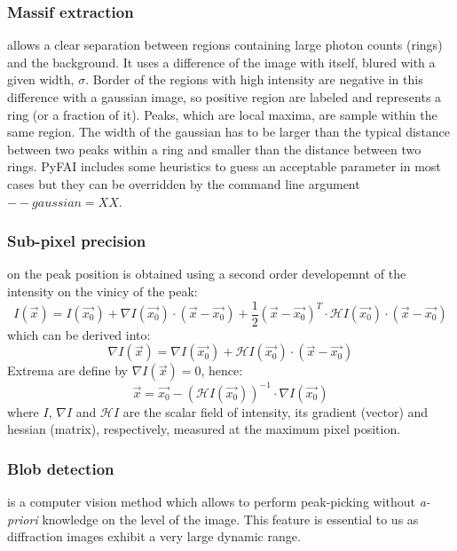 \documentclass[preprint]{iucr}
\begin{document}
\subsubsection{Massif extraction}
\label{massif}
allows a clear separation between regions containing large
photon counts (rings) and the background.
It uses a difference of the image with itself, blured with a given width,
$\sigma$. 
Border of the regions with high intensity are negative in this
difference with a gaussian image, so positive region are labeled and represents
a ring (or a fraction of it). Peaks, which are local maxima, are sample within
the same region.
The width of the gaussian has to be larger than the typical distance
between two peaks within a ring and smaller than the distance between two
rings. 
PyFAI includes some heuristics to guess an acceptable parameter in most cases
but they can be overridden by the command line argument $--gaussian=XX$.

\subsubsection{Sub-pixel precision} 
\label{subpixel}
on the peak position is obtained using a second order developemnt of the
intensity on the vinicy of the peak:
$$ I(\overrightarrow{x}) = I(\overrightarrow{x_0}) + \nabla
I(\overrightarrow{x_0})\cdot (\overrightarrow{x}-\overrightarrow{x_0}) +
\frac{1}{2} (\overrightarrow{x}-\overrightarrow{x_0})^T\cdot\mathcal{H}
I(\overrightarrow{x_0})\cdot(\overrightarrow{x}-\overrightarrow{x_0})$$ which
can be derived into:
$$\nabla I(\overrightarrow{x}) =\nabla I(\overrightarrow{x_0}) +
\mathcal{H}I(\overrightarrow{x_0})\cdot(\overrightarrow{x}-\overrightarrow{x_0})$$
Extrema are define by $\nabla I(\overrightarrow{x})=0$, hence:
$$\overrightarrow{x} = \overrightarrow{x_0} - (\mathcal{H}
I(\overrightarrow{x_0}))^{-1}\cdot\nabla I(\overrightarrow{x_0})$$ where $I$,
$\nabla I$ and $\mathcal{H} I$ are the scalar field of intensity, its gradient
(vector) and hessian (matrix), respectively, measured at the maximum pixel position.

\subsubsection{Blob detection}
\label{blob}
is a computer vision method which allows to perform peak-picking without
\textit{a-priori} knowledge on the level of the image.
This feature is essential to us as diffraction images exhibit a very large
dynamic range.
\end{document}
